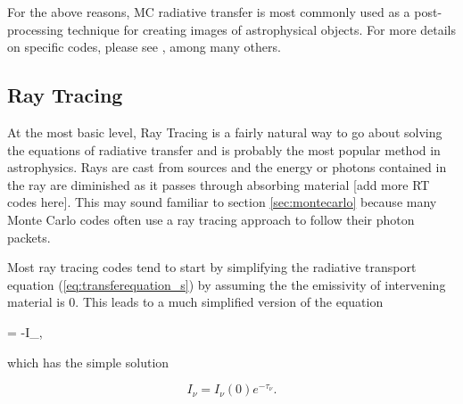 For the above reasons, MC radiative transfer is most commonly used as a post-processing technique for creating images of astrophysical objects. For more details on specific codes, please see \citet{dullemond12,cantalupoPorciani11,altayPelupessyCroft08,ercolanoEt03,nenkovaEt99,lucy99,harriesHowarth97}, among many others.




\subsection{Ray Tracing}
\label{sec:raytracing}

At the most basic level, Ray Tracing is a fairly natural way to go about solving the equations of radiative transfer and is probably the most popular method in astrophysics. Rays are cast from sources and the energy or photons contained in the ray are diminished as it passes through absorbing material \citep{razoumovScott99,abelNormanMadau99} [add more RT codes here]. This may sound familiar to section \ref{sec:montecarlo} because many Monte Carlo codes often use a ray tracing approach to follow their photon packets.

Most ray tracing codes tend to start by simplifying the radiative transport equation (\ref{eq:transferequation_s}) by assuming the the emissivity of intervening material is 0. This leads to a much simplified version of the equation

\begin{itemize}
\label{eq:transferequation_abs}
 = -I_{\nu},
\end{itemize}

which has the simple solution

\begin{equation}
\label{eq:transfersolution_abs}
I_{\nu} = I_{\nu}(0)e^{-\tau_{\nu}}.
\end{equation}

